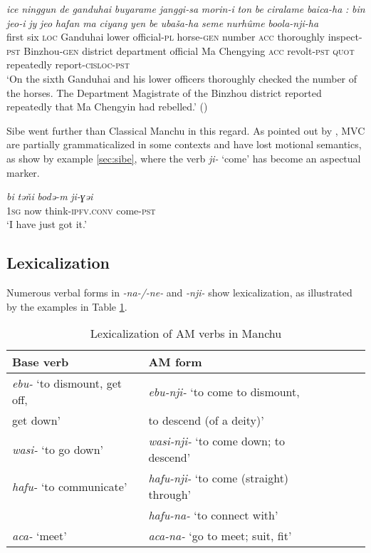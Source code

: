 \documentclass{article}
\newcommand{\ipa}[1]{\textit{{\phon\mbox{#1}}}} %
\begin{document}
\begin{exe}
\ex \label{ex:boolanjiha}
\gll
\ipa{ice} 	\ipa{ninggun} 	\ipa{de} 	\ipa{ganduhai} 	\ipa{buyarame} 	\ipa{janggi-sa} 	\ipa{morin-i} 	\ipa{ton} 	\ipa{be} 	\ipa{ciralame} 	\ipa{baica-ha} 	\ipa{:} 	{\ipa{bin} 	\ipa{jeo-i}} 	\ipa{jy} 	\ipa{jeo} 	\ipa{hafan} 	\ipa{ma} 	{\ipa{ciyang} 	\ipa{yen}} 	\ipa{be} 	\ipa{ubaša-ha} 	\ipa{seme} 	\ipa{nurhûme} 	\ipa{boola-nji-ha} 	\\
first six \textsc{loc} Ganduhai lower official-\textsc{pl} horse-\textsc{gen} number \textsc{acc} thoroughly inspect-\textsc{pst} { } Binzhou-\textsc{gen} district department official Ma Chengying \textsc{acc} revolt-\textsc{pst} \textsc{quot} repeatedly report-\textsc{cisloc-pst} \\
\glt `On the sixth Ganduhai and his lower officers thoroughly checked the number of the horses. The Department Magistrate of the Binzhou district reported repeatedly that Ma Chengyin had rebelled.' (\citealt[88/47]{cosmo06dzengseo})
\end{exe}

Sibe went further than Classical Manchu in this regard. As pointed out by \citet[156]{zikmundova13sibe}, MVC are partially grammaticalized in some contexts and have lost motional semantics, as show by example \ref{sec:sibe}, where the verb \ipa{ji-} `come' has become an aspectual marker.

\begin{exe}
\ex \label{sec:sibe}
\gll
\ipa{bi} 	\ipa{tǝňi} 	\ipa{bodǝ-m} 	\ipa{ji-ɣǝi} \\
\textsc{1sg} now think-\textsc{ipfv.conv} come-\textsc{pst} \\
\glt ‘I have just got it.'
\end{exe}


\subsection{Lexicalization} \label{sec:lexicalization}
Numerous verbal forms in \ipa{-na-/-ne-} and \ipa{-nji-} show lexicalization, as illustrated by the examples in Table \ref{tab:lexicalization}.

\begin{table}[h]
\caption{Lexicalization of AM verbs in Manchu} \label{tab:lexicalization} \centering
\begin{tabular}{lllll}
\toprule
Base verb & AM form  \\
\midrule
\ipa{ebu-} ‘to dismount, get off,  & \ipa{ebu-nji-} ‘to come to dismount, \\
get down’& to descend (of a deity)’\\
 \ipa{wasi-} ‘to go down’ & \ipa{wasi-nji-} ‘to come down; to descend’\\
 \ipa{hafu-} ‘to communicate’ & \ipa{hafu-nji-} ‘to come (straight) through’ \\
 & \ipa{hafu-na-} ‘to connect with’\\
 \ipa{aca-} `meet' &  \ipa{aca-na-} `go to meet; suit, fit' \\
 \bottomrule
\end{tabular}
\end{table}
\end{document}
